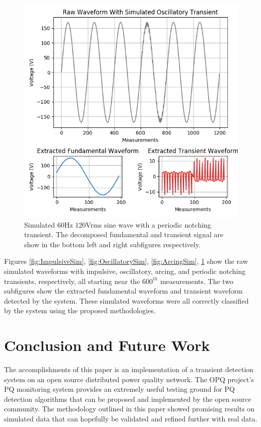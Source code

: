 \documentclass[10pt, conference, compsocconf]{IEEEtran}
\begin{document}
\begin{figure}[htbp]
\centering%
\includegraphics[scale=0.35]{./figures/notching_sim.png}
\caption{Simulated $60$Hz $120$Vrms sine wave with a periodic notching transient. The decomposed fundamental and transient signal are show in the bottom left and right subfigures respectively.}\label{fig:NotchingSim}
\end{figure}

Figures \ref{fig:ImpulsiveSim}, \ref{fig:OscillatorySim}, \ref{fig:ArcingSim}, \ref{fig:NotchingSim} show the raw simulated waveforms with impulsive, oscillatory, arcing, and periodic notching transients, respectively, all starting near the $600^{th}$ measurements. The two subfigures show the extracted fundamental waveform and transient waveform detected by the system. These simulated waveforms were all correctly classified by the system using the proposed methodologies.

\section{Conclusion and Future Work}
\label{sec:Conlcusion}
The accomplishments of this paper is an implementation of a transient detection system on an open source distributed power quality network. The OPQ project's PQ monitoring system provides an extremely useful testing ground for PQ detection algorithms that can be proposed and implemented by the open source community. The methodology outlined in this paper showed promising results on simulated data that can hopefully be validated and refined further with real data.
\end{document}
